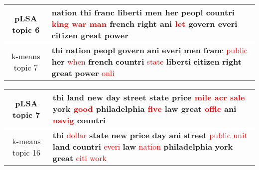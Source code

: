 \begin{center}\begin{tabularx}{\textwidth} {
  | c | >{\raggedright\arraybackslash}X | } \hline 
pLSA topic 6 & \textbf{nation} \textbf{thi} \textbf{franc} \textbf{liberti} \textbf{men} \textbf{her} \textbf{peopl} \textbf{countri} \textcolor{red}{king} \textcolor{red}{war} \textcolor{red}{man} \textbf{french} \textbf{right} \textbf{ani} \textcolor{red}{let} \textbf{govern} \textbf{everi} \textbf{citizen} \textbf{great} \textbf{power} \\ \hline 
k-means topic 7 & \textbf{thi} \textbf{nation} \textbf{peopl} \textbf{govern} \textbf{ani} \textbf{everi} \textbf{men} \textbf{franc} \textcolor{red}{public} \textbf{her} \textcolor{red}{when} \textbf{french} \textbf{countri} \textcolor{red}{state} \textbf{liberti} \textbf{citizen} \textbf{right} \textbf{great} \textbf{power} \textcolor{red}{onli} \\ \hline 
\end{tabularx}

\end{center}

\begin{center}\begin{tabularx}{\textwidth} {
  | c | >{\raggedright\arraybackslash}X | } \hline 
pLSA topic 7 & \textbf{thi} \textbf{land} \textbf{new} \textbf{day} \textbf{street} \textbf{state} \textbf{price} \textcolor{red}{mile} \textcolor{red}{acr} \textcolor{red}{sale} \textbf{york} \textcolor{red}{good} \textbf{philadelphia} \textcolor{red}{five} \textbf{law} \textbf{great} \textcolor{red}{offic} \textbf{ani} \textcolor{red}{navig} \textbf{countri} \\ \hline 
k-means topic 16 & \textbf{thi} \textcolor{red}{dollar} \textbf{state} \textbf{new} \textbf{price} \textbf{day} \textbf{ani} \textbf{street} \textcolor{red}{public} \textcolor{red}{unit} \textbf{land} \textbf{countri} \textcolor{red}{everi} \textbf{law} \textcolor{red}{nation} \textbf{philadelphia} \textbf{york} \textbf{great} \textcolor{red}{citi} \textcolor{red}{work} \\ \hline 
\end{tabularx}

\end{center}

